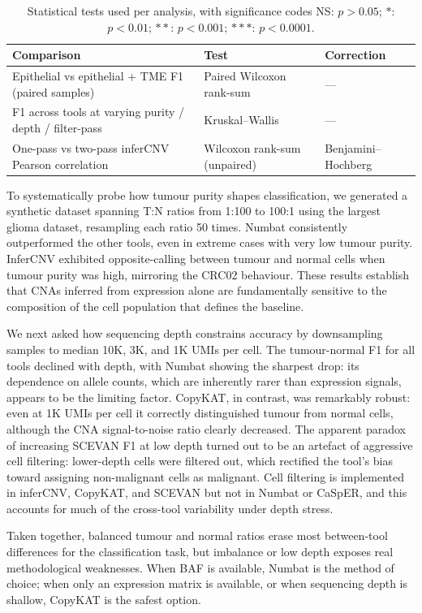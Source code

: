 \documentclass[11pt]{article}
\begin{document}
\begin{table}[htbp]
\centering
\caption{Statistical tests used per analysis, with significance codes
NS: $p > 0.05$; $*$: $p < 0.01$; $**$: $p < 0.001$; $***$: $p < 0.0001$.}
\label{tab:stats}
\small
\begin{tabular}{lll}
\toprule
Comparison & Test & Correction \\
\midrule
Epithelial vs epithelial + TME F1 (paired samples) & Paired Wilcoxon rank-sum & --- \\
F1 across tools at varying purity / depth / filter-pass & Kruskal--Wallis    & --- \\
One-pass vs two-pass inferCNV Pearson correlation    & Wilcoxon rank-sum (unpaired) & Benjamini--Hochberg \\
\bottomrule
\end{tabular}
\end{table}

To systematically probe how tumour purity shapes classification, we
generated a synthetic dataset spanning T:N ratios from 1:100 to 100:1 using
the largest glioma dataset, resampling each ratio 50 times. Numbat
consistently outperformed the other tools, even in extreme cases with very
low tumour purity. InferCNV exhibited opposite-calling between tumour and
normal cells when tumour purity was high, mirroring the CRC02 behaviour.
These results establish that CNAs inferred from expression alone are
fundamentally sensitive to the composition of the cell population that
defines the baseline.

We next asked how sequencing depth constrains accuracy by downsampling
samples to median 10K, 3K, and 1K UMIs per cell. The tumour-normal F1 for
all tools declined with depth, with Numbat showing the sharpest drop: its
dependence on allele counts, which are inherently rarer than expression
signals, appears to be the limiting factor. CopyKAT, in contrast, was
remarkably robust: even at 1K UMIs per cell it correctly distinguished
tumour from normal cells, although the CNA signal-to-noise ratio clearly
decreased. The apparent paradox of increasing SCEVAN F1 at low depth turned
out to be an artefact of aggressive cell filtering: lower-depth cells were
filtered out, which rectified the tool's bias toward assigning non-malignant
cells as malignant. Cell filtering is implemented in inferCNV, CopyKAT, and
SCEVAN but not in Numbat or CaSpER, and this accounts for much of the
cross-tool variability under depth stress.

Taken together, balanced tumour and normal ratios erase most between-tool
differences for the classification task, but imbalance or low depth exposes
real methodological weaknesses. When BAF is available, Numbat is the method
of choice; when only an expression matrix is available, or when sequencing
depth is shallow, CopyKAT is the safest option.
\end{document}
